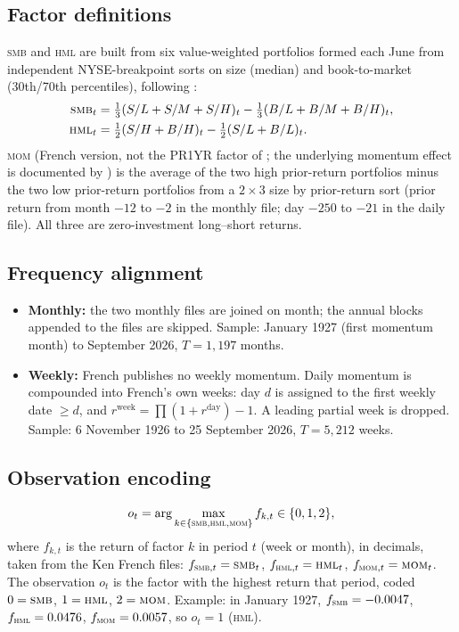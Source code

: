 \documentclass[11pt]{article}
\newcommand{\SMB}{\textsc{smb}}
\newcommand{\HML}{\textsc{hml}}
\newcommand{\MOM}{\textsc{mom}}
\begin{document}
\subsection{Factor definitions}
\SMB{} and \HML{} are built from six value-weighted portfolios formed each June from independent NYSE-breakpoint sorts on size (median) and book-to-market (30th/70th percentiles), following \citet{fama1993}:
\begin{align*}
\SMB_t &= \tfrac13(S/L+S/M+S/H)_t-\tfrac13(B/L+B/M+B/H)_t,\\
\HML_t &= \tfrac12(S/H+B/H)_t-\tfrac12(S/L+B/L)_t .
\end{align*}
\MOM{} (French version, not the PR1YR factor of \citealp{carhart1997}; the underlying momentum effect is documented by \citealp{jegadeesh1993}) is the average of the two high prior-return portfolios minus the two low prior-return portfolios from a $2\times3$ size by prior-return sort (prior return from month $-12$ to $-2$ in the monthly file; day $-250$ to $-21$ in the daily file). All three are zero-investment long--short returns.

\subsection{Frequency alignment}
\begin{itemize}
\item \textbf{Monthly:} the two monthly files are joined on month; the annual blocks appended to the files are skipped. Sample: January 1927 (first momentum month) to September 2026, $T=1{,}197$ months.
\item \textbf{Weekly:} French publishes no weekly momentum. Daily momentum is compounded into French's own weeks: day $d$ is assigned to the first weekly date $\ge d$, and $r^{\text{week}}=\prod(1+r^{\text{day}})-1$. A leading partial week is dropped. Sample: 6 November 1926 to 25 September 2026, $T=5{,}212$ weeks.
\end{itemize}

\subsection{Observation encoding}
\[
o_t=\arg\max_{k\in\{\SMB,\HML,\MOM\}} f_{k,t}\in\{0,1,2\},
\]
where $f_{k,t}$ is the return of factor $k$ in period $t$ (week or month), in decimals, taken from the Ken French files: $f_{\textsc{smb},t}=\SMB_t$, $f_{\textsc{hml},t}=\HML_t$, $f_{\textsc{mom},t}=\MOM_t$. The observation $o_t$ is the factor with the highest return that period, coded $0=\SMB$, $1=\HML$, $2=\MOM$. Example: in January 1927, $f_{\textsc{smb}}=-0.0047$, $f_{\textsc{hml}}=0.0476$, $f_{\textsc{mom}}=0.0057$, so $o_t=1$ (\HML).
\end{document}
